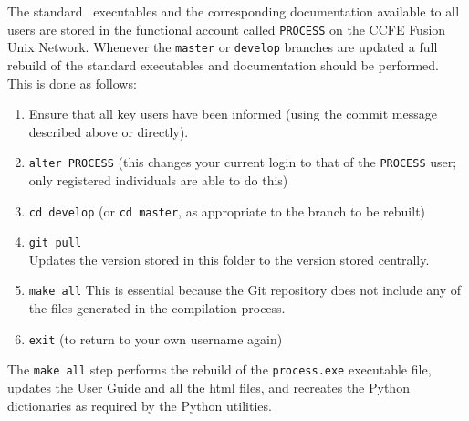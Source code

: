 The standard \process\ executables and the corresponding documentation
available to all users are stored in the functional account called
\texttt{PROCESS} on the CCFE Fusion Unix Network. Whenever the \texttt{master}
or \texttt{develop} branches are updated a full rebuild of the standard
executables and documentation should be performed. This is done as follows:
\begin{enumerate}

\item Ensure that all key users have been informed (using the commit message described above or directly).

\item \texttt{alter PROCESS}  (this changes your current login to that of the
  \texttt{PROCESS} user; only registered individuals are able to do this)

\item \texttt{cd develop}  (or \texttt{cd master}, as appropriate to the
  branch to be rebuilt)

\item \texttt{git pull}\\
Updates the version stored in this folder to the version stored centrally.

\item \texttt{make all}
This is essential because the Git repository does not include any of the files generated in the compilation process.

\item \texttt{exit}  (to return to your own username again)

\end{enumerate}

The \texttt{make all} step performs the rebuild of the \texttt{process.exe} executable
file, updates the User Guide and all the html files, and recreates the Python
dictionaries as required by the Python utilities.
